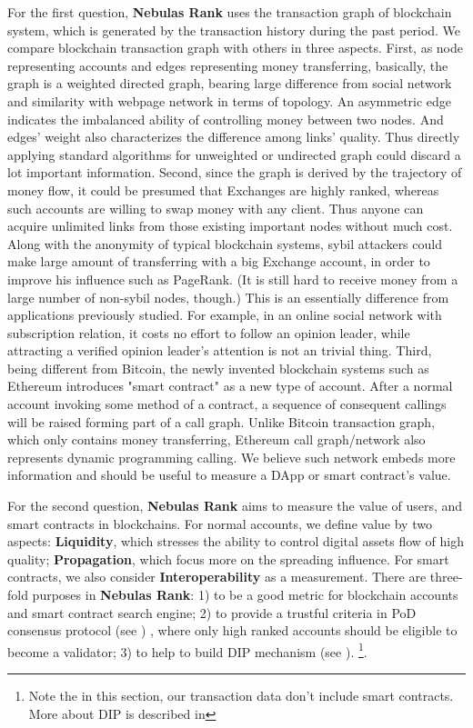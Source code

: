 For the first question, \textbf{Nebulas Rank} uses the transaction graph of blockchain system, which is generated by the transaction history during the past period. We compare blockchain transaction graph with others in three aspects. First, as node representing accounts and edges representing money transferring, basically, the graph is a weighted directed graph, bearing large difference from social network\cite{Ugander2011} and similarity with webpage network\cite{page1999pagerank} in terms of topology. An asymmetric edge indicates the imbalanced ability of controlling money between two nodes. And edges' weight also characterizes the difference among links' quality. Thus directly applying standard algorithms for unweighted or undirected graph could discard a lot important information. Second, since the graph is derived by the trajectory of money flow, it could be presumed that Exchanges are highly ranked, whereas such accounts are willing to swap money with any client. Thus anyone can acquire unlimited links from those existing important nodes without much cost. Along with the anonymity of typical blockchain systems, sybil attackers could make large amount of transferring with a big Exchange account, in order to improve his influence such as PageRank. (It is still hard to receive money from a large number of non-sybil nodes, though.) This is an essentially difference from applications previously studied. For example, in an online social network with subscription relation, it costs no effort to follow an opinion leader, while attracting a verified opinion leader's attention is not an trivial thing. Third, being different from Bitcoin\cite{Nakamoto2008}, the newly invented blockchain systems such as Ethereum\cite{Wood2014} introduces "smart contract" as a new type of account. After a normal account invoking some method of a contract, a sequence of consequent callings will be raised forming part of a call graph. Unlike Bitcoin transaction graph, which only contains money transferring, Ethereum call graph/network also represents dynamic programming calling. We believe such network embeds more information and should be useful to measure a DApp or smart contract's value.

For the second question, \textbf{Nebulas Rank} aims to measure the value of users, and smart contracts in blockchains. For normal accounts, we define value by two aspects: \textbf{Liquidity}, which stresses the ability to control digital assets flow of high quality; \textbf{Propagation}, which focus more on the spreading influence. For smart contracts, we also consider \textbf{Interoperability} as a measurement. There are three-fold purposes in \textbf{Nebulas Rank}: 1) to be a good metric for blockchain accounts and smart contract search engine; 2) to provide a trustful criteria in PoD consensus protocol (see ) , where only high ranked accounts should be eligible to become a validator; 3) to help to build DIP mechanism (see ). \footnote{Note the in this section, our transaction data don't include smart contracts. More about DIP is described in }.

